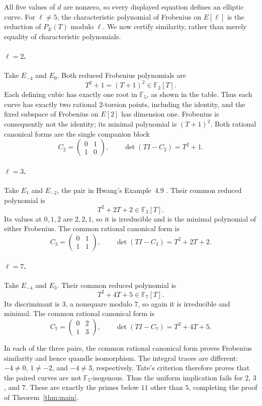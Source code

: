 \documentclass[11pt]{article}
\newcommand{\F}{\mathbb F}
\begin{document}
All five values of $d$ are nonzero, so every displayed equation defines an
elliptic curve.  For $\ell\ne5$, the characteristic polynomial of Frobenius
on $E[\ell]$ is the reduction of $P_E(T)$ modulo $\ell$.  We now certify
similarity, rather than merely equality of characteristic polynomials.

\paragraph{$\ell=2$.}
Take $E_{-4}$ and $E_0$.  Both reduced Frobenius polynomials are
\[
 T^2+1=(T+1)^2\in\F_2[T].
\]
Each defining cubic has exactly one root in $\F_5$, as shown in the table.
Thus each curve has exactly two rational $2$-torsion points, including the
identity, and the fixed subspace of Frobenius on $E[2]$ has dimension one.
Frobenius is consequently not the identity; its minimal polynomial is
$(T+1)^2$.  Both rational canonical forms are the single companion block
\[
 C_2=\begin{pmatrix}0&1\\1&0\end{pmatrix},\qquad
 \det(TI-C_2)=T^2+1.
\]

\paragraph{$\ell=3$.}
Take $E_1$ and $E_{-2}$, the pair in Hwang's Example~4.9
\cite[Example~4.9]{Hwang2026}.  Their common
reduced polynomial is
\[
 T^2+2T+2\in\F_3[T].
\]
Its values at $0,1,2$ are $2,2,1$, so it is irreducible and is the minimal
polynomial of either Frobenius.  The common rational canonical form is
\[
 C_3=\begin{pmatrix}0&1\\1&1\end{pmatrix},\qquad
 \det(TI-C_3)=T^2+2T+2.
\]

\paragraph{$\ell=7$.}
Take $E_{-4}$ and $E_3$.  Their common reduced polynomial is
\[
 T^2+4T+5\in\F_7[T].
\]
Its discriminant is $3$, a nonsquare modulo $7$, so again it is irreducible
and minimal.  The common rational canonical form is
\[
 C_7=\begin{pmatrix}0&2\\1&3\end{pmatrix},\qquad
 \det(TI-C_7)=T^2+4T+5.
\]

In each of the three pairs, the common rational canonical form proves
Frobenius similarity and hence quandle isomorphism.  The integral traces are
different: $-4\ne0$, $1\ne-2$, and $-4\ne3$, respectively.  Tate's
criterion therefore proves that the paired curves are not
$\F_5$-isogenous.  Thus the uniform implication fails for $2$, $3$, and
$7$.  These are exactly the primes below $11$ other than $5$, completing
the proof of Theorem~\ref{thm:main}.
\end{document}
